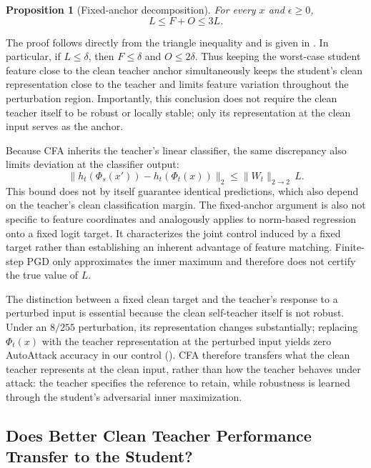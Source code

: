 \documentclass{article} %
\theoremstyle{plain}
\newtheorem{proposition}{Proposition}
\begin{document}
\begin{proposition}[Fixed-anchor decomposition]\label{prop:decomp}
For every \(x\) and \(\epsilon\ge0\),
\begin{equation}
L\le F+O\le3L.
\label{eqn:decomp}
\end{equation}
\end{proposition}
The proof follows directly from the triangle inequality and is given in
. In particular, if \(L\le\delta\), then
\(F\le\delta\) and \(O\le2\delta\). Thus keeping the worst-case student
feature close to the clean teacher anchor simultaneously keeps the student's
clean representation close to the teacher and limits feature variation
throughout the perturbation region. Importantly, this conclusion does not
require the clean teacher itself to be robust or locally stable; only its
representation at the clean input serves as the anchor.

Because CFA inherits the teacher's linear classifier, the same discrepancy
also limits deviation at the classifier output:
\begin{equation}
\|h_t(\Phi_s(x'))-h_t(\Phi_t(x))\|_2
\le \|W_t\|_{2\rightarrow2}\,L.
\end{equation}
This bound does not by itself guarantee identical predictions, which also
depend on the teacher's clean classification margin. The fixed-anchor argument
is also not specific to feature coordinates and analogously applies to
norm-based regression onto a fixed logit target. It characterizes the joint
control induced by a fixed target rather than establishing an inherent
advantage of feature matching. Finite-step PGD only approximates the inner
maximum and therefore does not certify the true value of \(L\).


The distinction between a fixed clean target and the teacher's response to a
perturbed input is essential because the clean self-teacher itself is not
robust. Under an $8/255$ perturbation, its representation changes
substantially; replacing $\Phi_t(x)$ with the teacher representation at the
perturbed input yields zero AutoAttack accuracy in our control
(). CFA therefore transfers what the clean teacher
represents at the clean input, rather than how the teacher behaves under
attack: the teacher specifies the reference to retain, while robustness is
learned through the student's adversarial inner maximization.

\subsection{Does Better Clean Teacher Performance Transfer to the Student?}
\label{sec:teacher_transfer}
\end{document}
